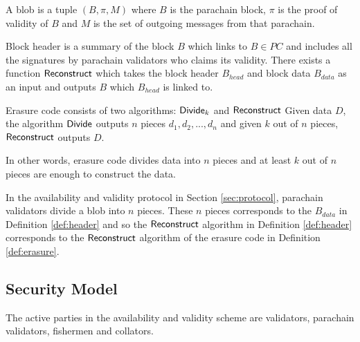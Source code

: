 \begin{definition}[Blob]
A blob is a tuple $(B, \pi, M)$ where $B$ is the parachain block, $\pi$ is the proof of validity of $B$ and $M$ is the set of outgoing messages from that parachain.
\end{definition}


\begin{definition}\label{def:header}
Block header is a summary of the block $B$ which links to $B\in PC$ and includes all the signatures by parachain validators who claims its validity. There exists a function $\mathsf{Reconstruct}$ which takes the block header $B_{head}$ and block data $B_{data}$ as an input and outputs $B$ which $B_{head}$ is linked to. 
\end{definition}



\begin{definition}\label{def:erasure}
Erasure code consists of two algorithms: $\mathsf{Divide}_k$ and $\mathsf{Reconstruct}$ Given data $D$, the algorithm $\mathsf{Divide}$ outputs $n$ pieces $d_1,d_2,...,d_n$ and given $k$ out of $n$ pieces, $\mathsf{Reconstruct}$ outputs $D$.  

\end{definition}

In other words, erasure code divides data into $n$ pieces and at least $k$ out of $n$ pieces are enough to construct the data.

In the availability and validity protocol in Section \ref{sec:protocol}, parachain validators divide a blob into $n$ pieces. These $n$ pieces corresponds to the $B_{data}$ in Definition \ref{def:header} and so the $\mathsf{Reconstruct}$ algorithm in Definition \ref{def:header}  corresponds to the $\mathsf{Reconstruct}$ algorithm of the erasure code in Definition \ref{def:erasure}.








\subsection{Security Model}



The active parties in the availability and validity scheme are validators, parachain validators, fishermen and collators. 




